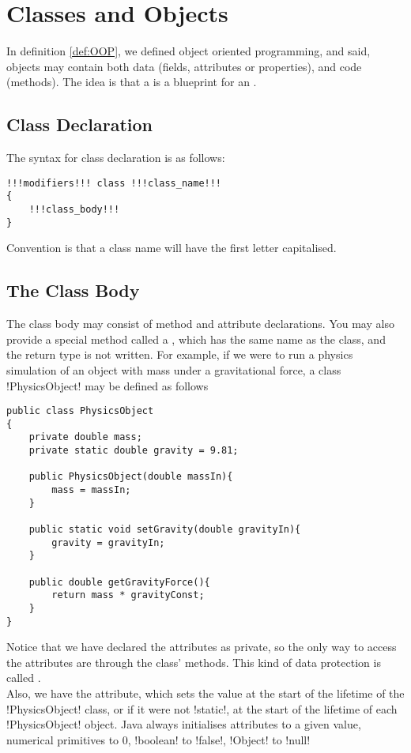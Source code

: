 \documentclass[11pt]{report}
\begin{document}
\section{Classes and Objects}
\label{sec:classesAndObjects}
In definition \ref{def:OOP}, we defined object oriented programming, and said, objects may contain both data (fields, attributes or properties), and code (methods). The idea is that a  is a blueprint for an . 
\subsection{Class Declaration}
The syntax for class declaration is as follows:
\vspace{-15pt}
\begin{lstlisting}[style=javaSyntax]
!!!modifiers!!! class !!!class_name!!!
{
    !!!class_body!!!
}
\end{lstlisting}
Convention is that a class name will have the first letter capitalised.
\subsection{The Class Body}
The class body may consist of method and attribute declarations. You may also provide a special method called a , which has the same name as the class, and the return type is not written. For example, if we were to run a physics simulation of an object with mass under a gravitational force, a class \inlineJava!PhysicsObject! may be defined as follows
\begin{lstlisting}[caption=PhysicsObject, label=lst:PhysicsObject]
public class PhysicsObject
{
    private double mass;
    private static double gravity = 9.81;

    public PhysicsObject(double massIn){
        mass = massIn;
    }

    public static void setGravity(double gravityIn){
        gravity = gravityIn;
    }

    public double getGravityForce(){
        return mass * gravityConst;
    }   
}
\end{lstlisting}
Notice that we have declared the attributes as private, so the only way to access the attributes are through the class' methods. This kind of data protection is called . \\ Also, we have  the  attribute, which sets the value at the start of the lifetime of the \inlineJava!PhysicsObject! class, or if it were not \inlineJava!static!, at the start of the lifetime of each \inlineJava!PhysicsObject! object. Java always initialises attributes to a given value, numerical primitives to 0, \inlineJava!boolean! to \inlineJava!false!, \inlineJava!Object! to \inlineJava!null!
\end{document}
